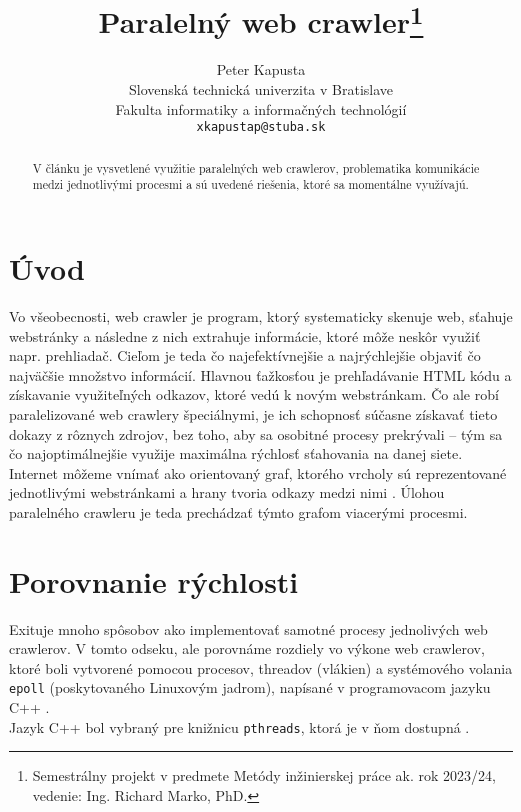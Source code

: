 \documentclass[10pt,twoside,slovak,a4paper]{article}
\title{Paralelný web crawler\thanks{Semestrálny projekt v predmete Metódy inžinierskej práce ak. rok 2023/24, vedenie: Ing. Richard Marko, PhD.}}
\author{Peter Kapusta\\[2pt]
	{\small Slovenská technická univerzita v Bratislave}\\
	{\small Fakulta informatiky a informačných technológií}\\
	{\small \texttt{xkapustap@stuba.sk}}
}
\begin{document}
\maketitle


\begin{abstract}
V článku je vysvetlené využitie paralelných web crawlerov, problematika komunikácie medzi jednotlivými procesmi a sú uvedené riešenia, ktoré sa momentálne využívajú.
\end{abstract}

\section{Úvod}

Vo všeobecnosti, web crawler je program, ktorý systematicky skenuje web, sťahuje webstránky a následne z nich extrahuje informácie, ktoré môže neskôr využiť napr. prehliadač. Cieľom je teda čo najefektívnejšie a najrýchlejšie objaviť čo najväčšie množstvo informácií. Hlavnou ťažkosťou je prehľadávanie HTML kódu a získavanie využiteľných odkazov, ktoré vedú k novým webstránkam. Čo ale robí paralelizované web crawlery špeciálnymi, je ich schopnosť súčasne získavať tieto dokazy z rôznych zdrojov, bez toho, aby sa osobitné procesy prekrývali – tým sa čo najoptimálnejšie využije maximálna rýchlosť sťahovania na danej siete. Internet môžeme vnímať ako orientovaný graf, ktorého vrcholy sú reprezentované jednotlivými webstránkami a hrany tvoria odkazy medzi nimi \cite{7148493}. Úlohou paralelného crawleru je teda prechádzať týmto grafom viacerými procesmi.

\newpage

\section{Porovnanie rýchlosti}
Exituje mnoho spôsobov ako implementovať samotné procesy jednolivých web crawlerov. V tomto odseku, ale porovnáme rozdiely vo výkone web crawlerov, ktoré boli vytvorené pomocou procesov, threadov (vlákien) a systémového volania \texttt{epoll} (poskytovaného Linuxovým jadrom), napísané v programovacom jazyku C++ \cite{9648837}. \\

Jazyk C++ bol vybraný pre knižnicu \texttt{pthreads}, ktorá je v ňom dostupná \cite{9648837}. 
\end{document}
